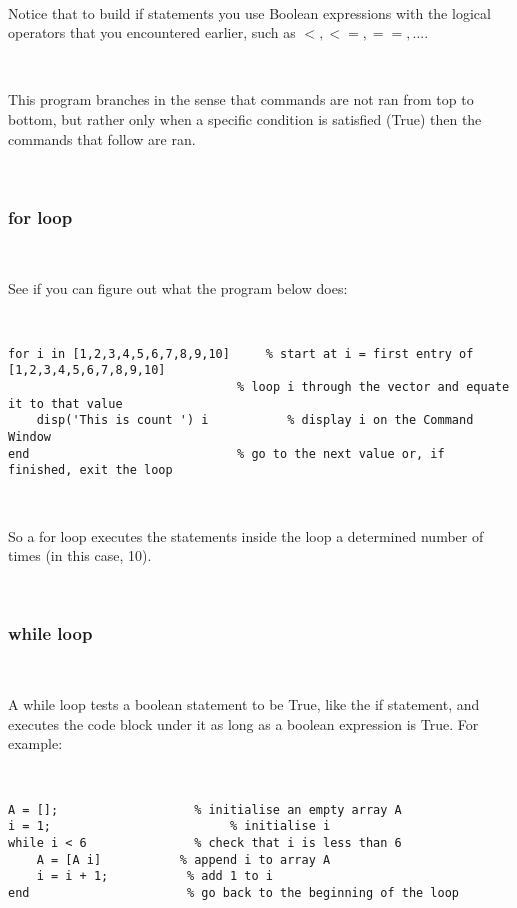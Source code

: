 \documentclass[11pt]{amsart}
\begin{document}
\

Notice that to build if statements you use Boolean expressions with the logical operators that you encountered earlier, such as $<, <=, ==, ...$.

\

This program branches in the sense that commands are not ran from top to bottom, but rather only when a specific condition is satisfied (True) then the commands that follow are ran.

\

\subsubsection{for loop}

\

See if you can figure out what the program below does:

\

\color{blue}
\begin{verbatim}
for i in [1,2,3,4,5,6,7,8,9,10]		% start at i = first entry of [1,2,3,4,5,6,7,8,9,10] 
                                % loop i through the vector and equate it to that value
    disp('This is count ') i		   % display i on the Command Window
end	                            % go to the next value or, if finished, exit the loop
\end{verbatim}
\color{black}

\

So a for loop executes the statements inside the loop a determined number of times (in this case, 10).

\

\subsubsection{while loop}

\

A while loop tests a boolean statement to be True, like the if statement, and  executes the code block under it as long as a boolean expression is True. For example:

\

\color{blue}
\begin{verbatim}
A = [];		              % initialise an empty array A
i = 1;			               % initialise i
while i < 6		          % check that i is less than 6
    A = [A i]	        % append i to array A
    i = i + 1;           % add 1 to i
end                      % go back to the beginning of the loop
\end{verbatim}
\color{black}
\end{document}
